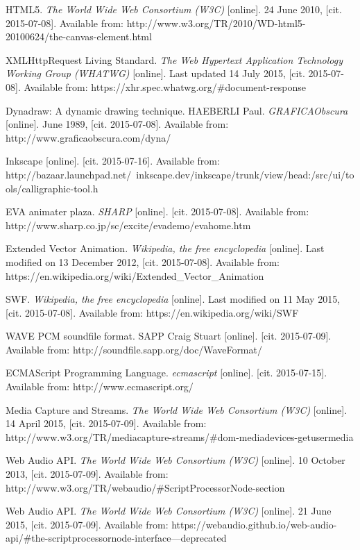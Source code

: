 \begin{thebibliography}{99}
HTML5. \emph{The World Wide Web Consortium (W3C)} [online]. 24 June 2010, [cit. 2015-07-08]. Available from: http://www.w3.org/TR/2010/WD-html5-20100624/the-canvas-element.html

XMLHttpRequest Living Standard. \emph{The Web Hypertext Application Technology Working Group (WHATWG)} [online]. Last updated 14 July 2015, [cit. 2015-07-08]. Available from: https://xhr.spec.whatwg.org/\#document-response


Dynadraw: A dynamic drawing technique. HAEBERLI Paul. \emph{GRAFICAObscura} [online]. June 1989, [cit. 2015-07-08]. Available from: http://www.graficaobscura.com/dyna/

Inkscape [online]. [cit. 2015-07-16]. Available from: http://bazaar.launchpad.net/~inkscape.dev/inkscape/trunk/view/head:/src/ui/tools/calligraphic-tool.h

EVA animater plaza. \emph{SHARP} [online]. [cit. 2015-07-08]. Available from: http://www.sharp.co.jp/sc/excite/evademo/evahome.htm

Extended Vector Animation. \emph{Wikipedia, the free encyclopedia} [online]. Last modified on 13 December 2012, [cit. 2015-07-08]. Available from: https://en.wikipedia.org/wiki/Extended\_Vector\_Animation

SWF. \emph{Wikipedia, the free encyclopedia} [online]. Last modified on 11 May 2015, [cit. 2015-07-08]. Available from: https://en.wikipedia.org/wiki/SWF

WAVE PCM soundfile format. SAPP Craig Stuart [online]. [cit. 2015-07-09]. Available from: http://soundfile.sapp.org/doc/WaveFormat/


ECMAScript Programming Language. \emph{ecmascript} [online]. [cit. 2015-07-15]. Available from: http://www.ecmascript.org/

Media Capture and Streams. \emph{The World Wide Web Consortium (W3C)} [online]. 14 April 2015, [cit. 2015-07-09]. Available from: http://www.w3.org/TR/mediacapture-streams/\#dom-mediadevices-getusermedia

Web Audio API. \emph{The World Wide Web Consortium (W3C)} [online]. 10 October 2013, [cit. 2015-07-09]. Available from: http://www.w3.org/TR/webaudio/\#ScriptProcessorNode-section

Web Audio API. \emph{The World Wide Web Consortium (W3C)} [online]. 21 June 2015, [cit. 2015-07-09]. Available from: https://webaudio.github.io/web-audio-api/\#the-scriptprocessornode-interface---deprecated


\end{thebibliography}

